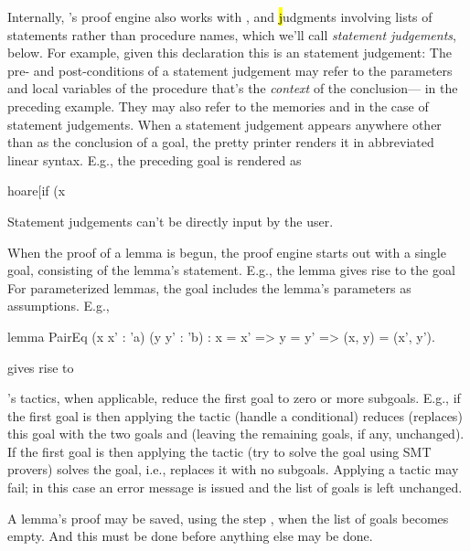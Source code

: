 Internally, \EasyCrypt's proof engine also works with \prhl, \phl and
\hl judgments involving lists of statements rather than procedure
names, which we'll call \emph{statement judgements}, below. For
example, given this declaration
this is an \phl statement judgement:
The pre- and post-conditions of a statement judgement may refer to the
parameters and local variables of the procedure that's the
\emph{context} of the conclusion--- in the preceding
example. They may also refer to the memories  and 
in the case of \prhl statement judgements.
When a statement judgement appears anywhere other than as the conclusion of
a goal, the pretty printer renders it in abbreviated linear syntax.
E.g., the preceding goal is rendered as
\begin{easycrypt}{}{}
hoare[if (x %
\end{easycrypt}
Statement judgements can't be directly input by the user.

When the proof of a lemma is begun, the proof engine starts out with
a single goal, consisting of the lemma's statement. E.g.,
the lemma
gives rise to the goal
For parameterized lemmas, the goal includes the lemma's parameters
as assumptions. E.g.,
\begin{easycrypt}{}{}
lemma PairEq (x x' : 'a) (y y' : 'b) :
  x = x' => y = y' => (x, y) = (x', y').
\end{easycrypt}
gives rise to

\EasyCrypt's tactics, when applicable, reduce the first goal to zero
or more subgoals.  E.g., if the first goal is
then applying the  tactic (handle a conditional) reduces
(replaces) this goal with the two goals
 and
(leaving the remaining goals, if any, unchanged).
If the first goal is
then applying the  tactic (try to solve the goal using
SMT provers) solves the goal, i.e., replaces it with no subgoals.
Applying a tactic may fail; in this case an error message is issued
and the list of goals is left unchanged.

A lemma's proof may be saved, using the step , when the list
of goals becomes empty. And this must be done before anything else may
be done.

